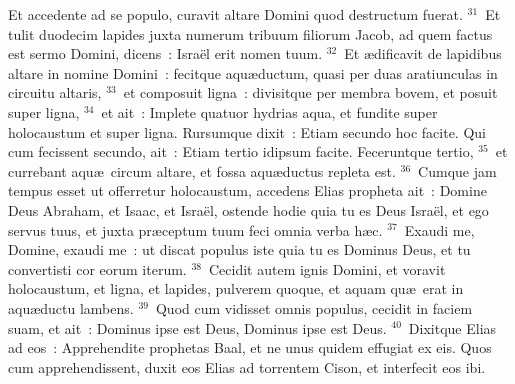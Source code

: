  Et accedente ad se populo, curavit altare Domini quod destructum fuerat.
${}^{31}$~Et tulit duodecim lapides juxta numerum tribuum filiorum Jacob, ad quem factus est sermo Domini, dicens~: Isra\"el erit nomen tuum.
${}^{32}$~Et \ae dificavit de lapidibus altare in nomine Domini~: fecitque aqu\ae ductum, quasi per duas aratiunculas in circuitu altaris,
${}^{33}$~et composuit ligna~: divisitque per membra bovem, et posuit super ligna,
${}^{34}$~et ait~: Implete quatuor hydrias aqua, et fundite super holocaustum et super ligna. Rursumque dixit~: Etiam secundo hoc facite. Qui cum fecissent secundo, ait~: Etiam tertio idipsum facite. Feceruntque tertio,
${}^{35}$~et currebant aqu\ae\ circum altare, et fossa aqu\ae ductus repleta est.
${}^{36}$~Cumque jam tempus esset ut offerretur holocaustum, accedens Elias propheta ait~: Domine Deus Abraham, et Isaac, et Isra\"el, ostende hodie quia tu es Deus Isra\"el, et ego servus tuus, et juxta pr\ae ceptum tuum feci omnia verba h\ae c.
${}^{37}$~Exaudi me, Domine, exaudi me~: ut discat populus iste quia tu es Dominus Deus, et tu convertisti cor eorum iterum.
${}^{38}$~Cecidit autem ignis Domini, et voravit holocaustum, et ligna, et lapides, pulverem quoque, et aquam qu\ae\ erat in aqu\ae ductu lambens.
${}^{39}$~Quod cum vidisset omnis populus, cecidit in faciem suam, et ait~: Dominus ipse est Deus, Dominus ipse est Deus.
${}^{40}$~Dixitque Elias ad eos~: Apprehendite prophetas Baal, et ne unus quidem effugiat ex eis. Quos cum apprehendissent, duxit eos Elias ad torrentem Cison, et interfecit eos ibi.


